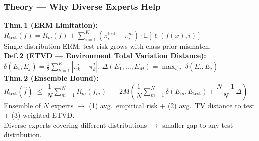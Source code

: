 \documentclass[10pt,aspectratio=169]{beamer}
\begin{document}
\begin{frame}
\frametitle{Theory --- Why Diverse Experts Help}
{\small
\textbf{Thm.\,1 (ERM Limitation):}\\[2pt]
$R_\text{test}(f) = R_m(f) + \textstyle\sum_{i=1}^{K}(\pi_i^\text{test}-\pi_i^m)\cdot\mathbb{E}[\ell(f(x),i)]$\\[2pt]
{\scriptsize Single-distribution ERM: test risk grows with class prior mismatch.}\\[8pt]

\textbf{Def.\,2 (ETVD --- Environment Total Variation Distance):}\\[2pt]
$\delta(E_i,E_j) = \frac{1}{2}\textstyle\sum_{k=1}^{K}|\pi_k^i - \pi_k^j|$, \quad
$\Delta(E_1,\ldots,E_M) = \max_{i,j}\;\delta(E_i,E_j)$\\[8pt]

\textbf{Thm.\,2 (Ensemble Bound):}\\[2pt]
$R_\text{test}(\hat{f}) \;\le\; \dfrac{1}{N}\!\sum_{m=1}^{N}\!R_m(f_m) \;+\; 2M\!\left(\dfrac{1}{N}\!\sum_{m=1}^{N}\!\delta(E_m,E_\text{test}) + \dfrac{N\!-\!1}{N}\,\Delta\right)$\\[4pt]
{\scriptsize Ensemble of $N$ experts $\rightarrow$ (1) avg.\ empirical risk + (2) avg.\ TV distance to test + (3) weighted ETVD.}\\
{\scriptsize Diverse experts covering different distributions $\rightarrow$ smaller gap to any test distribution.}
}
\end{frame}
\end{document}

